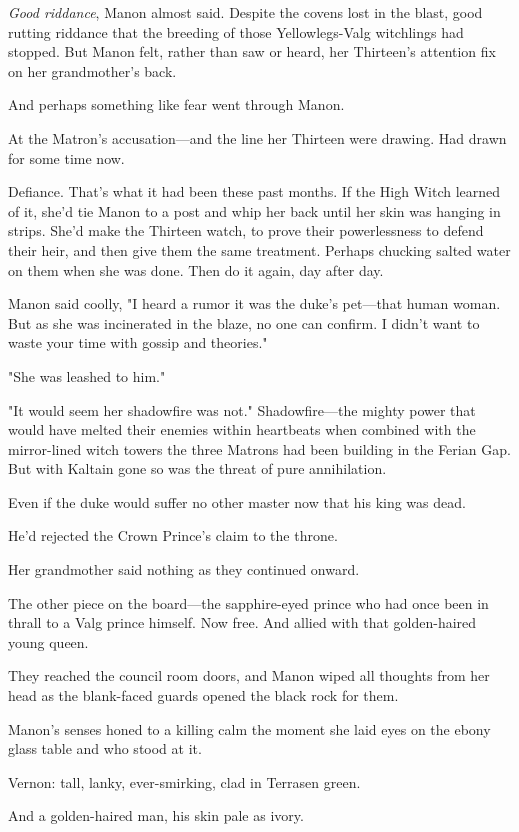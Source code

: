 \emph{Good riddance}, Manon almost said. Despite the covens lost in the blast, good rutting riddance that the breeding of those Yellowlegs-Valg witchlings had stopped. But Manon felt, rather than saw or heard, her Thirteen's attention fix on her grandmother's back.

And perhaps something like fear went through Manon.

At the Matron's accusation---and the line her Thirteen were drawing. Had drawn for some time now.

Defiance. That's what it had been these past months. If the High Witch learned of it, she'd tie Manon to a post and whip her back until her skin was hanging in strips. She'd make the Thirteen watch, to prove their powerlessness to defend their heir, and then give them the same treatment. Perhaps chucking salted water on them when she was done. Then do it again, day after day.

Manon said coolly, "I heard a rumor it was the duke's pet---that human woman. But as she was incinerated in the blaze, no one can confirm. I didn't want to waste your time with gossip and theories."

"She was leashed to him."

"It would seem her shadowfire was not." Shadowfire---the mighty power that would have melted their enemies within heartbeats when combined with the mirror-lined witch towers the three Matrons had been building in the Ferian Gap. But with Kaltain gone  so was the threat of pure annihilation.

Even if the duke would suffer no other master now that his king was dead.

He'd rejected the Crown Prince's claim to the throne.

Her grandmother said nothing as they continued onward.

The other piece on the board---the sapphire-eyed prince who had once been in thrall to a Valg prince himself. Now free. And allied with that golden-haired young queen.

They reached the council room doors, and Manon wiped all thoughts from her head as the blank-faced guards opened the black rock for them.

Manon's senses honed to a killing calm the moment she laid eyes on the ebony glass table and who stood at it.

Vernon: tall, lanky, ever-smirking, clad in Terrasen green.

And a golden-haired man, his skin pale as ivory.

